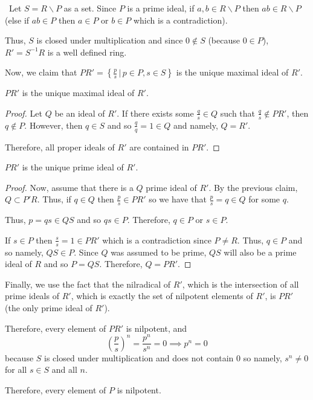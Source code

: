 \documentclass[12pt]{AlgebraQual}
\begin{document}
\begin{solution}$\,$
Let $S=R\backslash P$ as a set. Since $P$ is a prime ideal, if $a, b\in R\backslash P$ then $ab\in R\backslash P$ (else if $ab\in P$ then $a\in P$ or $b\in P$ which is a contradiction).

Thus, $S$ is closed under multiplication and since $0\notin S$ (because $0\in P$), $R'=S^{-1}R$ is a well defined ring.

Now, we claim that $PR'=\left\{\frac{p}{s}\,|\, p\in P,s\in S\right\}$ is the unique maximal ideal of $R'$.

\begin{claim} $PR'$ is the unique maximal ideal of $R'.$
\begin{proof} Let $Q$ be an ideal of $R'$. If there exists some $\frac{q}{s}\in Q$ such that $\frac{q}{s}\notin PR'$, then $q\notin P$. However, then $q\in S$ and so $\frac{q}{q}=1\in Q$ and namely, $Q=R'$.

Therefore, all proper ideals of $R'$ are contained in $PR'.$
\end{proof}
\end{claim}

\begin{claim} $PR'$ is the unique prime ideal of $R'.$
\begin{proof} Now, assume that there is a $Q$ prime ideal of $R'$. By the previous claim, $Q\subset P'R.$ Thus, if $q\in Q$ then $\frac{p}{s}\in PR'$ so we have that $\frac{p}{s}=q\in Q$ for some $q$.

Thus, $p=qs\in QS$ and so $qs\in P$. Therefore, $q\in P$ or $s\in P.$

If $s\in P$ then $\frac{s}{s}=1\in PR'$ which is a contradiction since $P\not=R$. Thus, $q\in P$ and so namely, $QS\in P$. Since $Q$ was assumed to be prime, $QS$ will also be a prime ideal of $R$ and so $P=QS$. Therefore, $Q=PR'.$
\end{proof}
\end{claim}

Finally, we use the fact that the nilradical of $R'$, which is the intersection of all prime ideals of $R'$, which is exactly the set of nilpotent elements of $R'$, is $PR'$ (the only prime ideal of $R'$).

Therefore, every element of $PR'$ is nilpotent, and $$\left(\frac{p}{s}\right)^n=\frac{p^n}{s^n}=0\implies p^n=0$$ because $S$ is closed under multiplication and does not contain $0$ so namely, $s^n\not=0$ for all $s\in S$ and all $n.$

Therefore, every element of $P$ is nilpotent.
\end{solution}
\newpage
\end{document}
